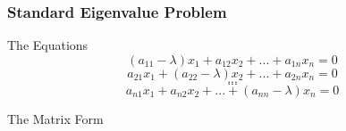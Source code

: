 \documentclass[fleqn]{ltx-talk} %
\newcommand{\sectionIsubsectionIItitle}{Standard Eigenvalue Problem}
\begin{document}
			\begin{frame}
				\frametitle{\sectionIsubsectionIItitle} \small
				\bigskip

				The Equations \vspace{1mm}\\
				\[(a_{11}-\lambda) x_1 + a_{12} x_{2} + ... + a_{1n} x_n = 0 \]
				\[a_{21} x_1 + (a_{22}-\lambda)  x_{2} + ... + a_{2n} x_n = 0 \]
				\[. . .\]
				\[. . .\]
				\[a_{n1} x_1 + a_{n2} x_{2} + ... + (a_{nn}-\lambda) x_n = 0 \]	

				The Matrix Form \\

				\btVFill
			\end{frame}

\end{document}
